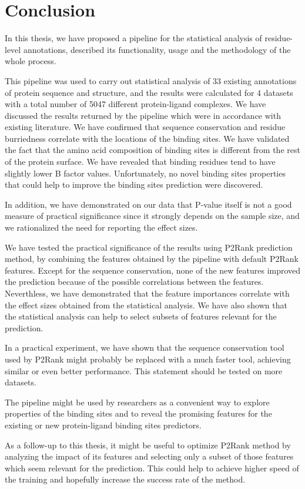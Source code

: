\chapter*{Conclusion}

In this thesis, we have proposed a pipeline for the statistical analysis of residue-level annotations, described its functionality, usage and the methodology of the whole process.

This pipeline was used to carry out statistical analysis of 33 existing annotations of protein sequence and structure, and the results were calculated for 4 datasets with a total number of 5047 different protein-ligand complexes. We have discussed the results returned by the pipeline which were in accordance with existing literature. We have confirmed that sequence conservation and residue burriedness correlate with the locations of the binding sites. We have validated the fact that the amino acid composition of binding sites is different from the rest of the protein surface. We have revealed that binding residues tend to have slightly lower B factor values. Unfortunately, no novel binding sites properties that could help to improve the binding sites prediction were discovered.

In addition, we have demonstrated on our data that P-value itself is not a good measure of practical significance since it strongly depends on the sample size, and we rationalized the need for reporting the effect sizes.

We have tested the practical significance of the results using P2Rank prediction method, by combining the features obtained by the pipeline with default P2Rank features. Except for the sequence conservation, none of the new features improved the prediction because of the possible correlations between the features. Neverthless, we have demonstrated that the feature importances correlate with the effect sizes obtained from the statistical analysis. We have also shown that the statistical analysis can help to select subsets of features relevant for the prediction. 

In a practical experiment, we have shown that the sequence conservation tool used by P2Rank might probably be replaced with a much faster tool, achieving similar or even better performance. This statement should be tested on more datasets.

The pipeline might be used by researchers as a convenient way to explore properties of the binding sites and to reveal the promising features for the existing or new protein-ligand binding sites predictors.

As a follow-up to this thesis, it might be useful to optimize P2Rank method by analyzing the impact of its features and selecting only a subset of those features which seem relevant for the prediction. This could help to achieve higher speed of the training and hopefully increase the success rate of the method. 
